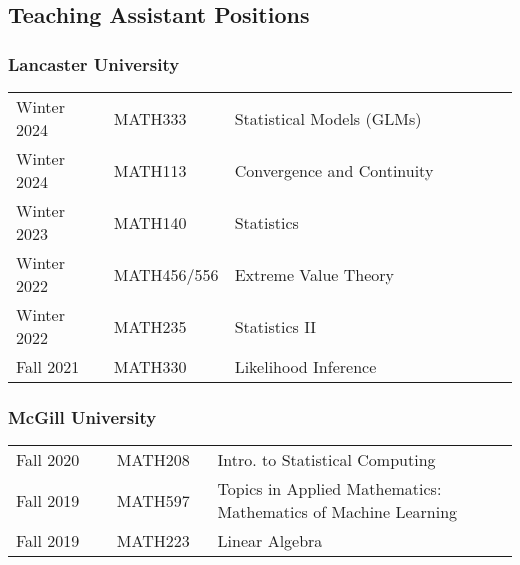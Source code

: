 \documentclass[11pt,]{scrartcl}
\begin{document}
\subsection{Teaching Assistant Positions}\label{teaching-assistant}
\subsubsection{Lancaster University}
\begin{table}[!h]
{\def\arraystretch{1.1}\tabcolsep=0pt
\begin{tabular}{p{0.20\linewidth}p{0.20\linewidth}p{0.60\linewidth}}
  
  Winter 2024 & MATH333 & Statistical Models (GLMs)\\
  Winter 2024 & MATH113 & Convergence and Continuity\\
  Winter 2023 & MATH140 & Statistics \\
  Winter 2022 & MATH456/556 & Extreme Value Theory \\
  Winter 2022 & MATH235 & Statistics II \\
  
  Fall 2021 & MATH330 & Likelihood Inference 
\end{tabular}%
}
\end{table}
\newpage
\subsubsection{McGill University}
\begin{table}[!h]
{\def\arraystretch{1.1}\tabcolsep=0pt
\begin{tabular}{p{0.20\linewidth}p{0.20\linewidth}p{0.60\linewidth}}

  Fall 2020 & MATH208 & Intro. to Statistical Computing \\

  Fall 2019 & MATH597 & Topics in Applied Mathematics: Mathematics of Machine Learning  \\
  
  Fall 2019 & MATH223 & Linear Algebra  \\
\end{tabular}%
}
\end{table}



%
\end{document}
